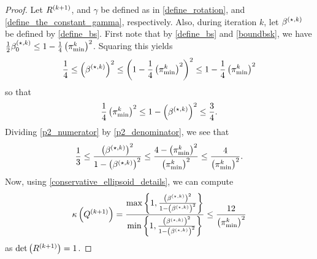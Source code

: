 \begin{proof}

Let ${R^{(k+1)}}$, and $\gamma$ be defined as in \cref{define_rotation}, and \cref{define_the_constant_gamma}, respectively.
Also, during iteration $k$, let ${\beta^{(\star, k)}}$ be defined by \cref{define_bs}.
First note that by \cref{define_bs} and \cref{boundbsk}, we have
$\frac 1 2 {\beta_0^{(\star, k)}} \le 1 - \frac 1 4 \left({\pi^k_{\textrm{min}}}\right)^2$.
Squaring this yields
\begin{align}
\frac {1} 4 \le \left({\beta^{(\star, k)}}\right)^2 \le \left(1 - \frac 1 4 \left({\pi^k_{\textrm{min}}}\right)^2\right)^2 \le 1 - \frac 1 4 \left({\pi^k_{\textrm{min}}}\right)^2 \label{p2_numerator}
\end{align}
so that
\begin{align}
\frac 1 4  \left({\pi^k_{\textrm{min}}}\right)^2 \le 1 - \left({\beta^{(\star, k)}}\right)^2 \le \frac 3 4. \label{p2_denominator}
\end{align}
Dividing \cref{p2_numerator} by \cref{p2_denominator}, we see that
\begin{align*}
\frac 1 3
\le \frac{\left({\beta^{(\star, k)}}\right)^2}{1 - \left({\beta^{(\star, k)}}\right)^2}
\le \frac {4 - \left({\pi^k_{\textrm{min}}}\right)^2}{\left({\pi^k_{\textrm{min}}}\right)^2} \le \frac {4}{\left({\pi^k_{\textrm{min}}}\right)^2}.
\end{align*}
Now, using \cref{conservative_ellipsoid_details}, we can compute 
\begin{align*}
{\kappa} \left({Q^{(k+1)}}\right) 
= \frac{\max\left\{1, \frac{\left({\beta^{(\star, k)}}\right)^2}{1 - \left({\beta^{(\star, k)}}\right)^2}\right\}}{\min\left\{1, \frac{\left({\beta^{(\star, k)}}\right)^2}{1 - \left({\beta^{(\star, k)}}\right)^2}\right\}} 
\le \frac {12}{\left({\pi^k_{\textrm{min}}}\right)^2}
\end{align*}
as $\det\left({R^{(k+1)}}\right) = 1$.
\end{proof}




\begin{lemma}
\label[lemma]{cone_subset_cone}

Given $u, v \in \Rn$, and $\gamma \in (0, 1]$, $\beta \in [0, \gamma)$ that satisfy $\|u\| = \|v\|= 1$, $u^Tv = \gamma$, define
\begin{align*}
B = \{x\in\Rn | {v}^Tx \ge \beta\|x\|\}, \quad
S = \left\{x\in\Rn \bigg| u^Tx \ge \left(\beta\gamma + \sqrt{(1 - \beta^2)\left(1 - \gamma^2\right)}\right)\|x\| \right\}. 
\end{align*}
Then, $S \subseteq B$.
\end{lemma}

